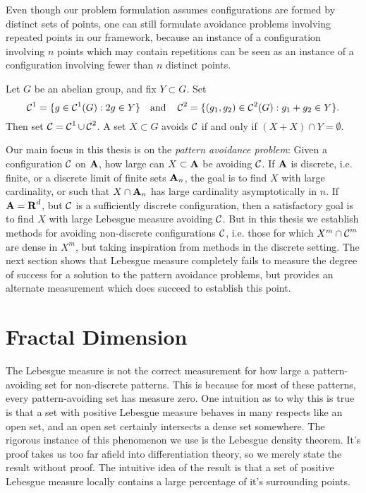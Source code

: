 Even though our problem formulation assumes configurations are formed by distinct sets of points, one can still formulate avoidance problems involving repeated points in our framework, because an instance of a configuration involving $n$ points which may contain repetitions can be seen as an instance of a configuration involving fewer than $n$ distinct points.

\begin{example}
	Let $G$ be an abelian group, and fix $Y \subset G$. Set
	\[ \operatorname{\mathcal{C}}^1 = \{ g \in \operatorname{\mathcal{C}}^1(G): 2g \in Y \} \quad \text{and} \quad \operatorname{\mathcal{C}}^2 = \{ (g_1,g_2) \in \operatorname{\mathcal{C}}^2(G): g_1 + g_2 \in Y \}. \]
	Then set $\operatorname{\mathcal{C}} = \operatorname{\mathcal{C}}^1 \cup \operatorname{\mathcal{C}}^2$. A set $X \subset G$ avoids $\operatorname{\mathcal{C}}$ if and only if $(X + X) \cap Y = \emptyset$.
\end{example}

Our main focus in this thesis is on the {\it pattern avoidance problem}: Given a configuration $\operatorname{\mathcal{C}}$ on $\operatorname{\mathbf{A}}$, how large can $X \subset \operatorname{\mathbf{A}}$ be avoiding $\operatorname{\mathcal{C}}$. If $\operatorname{\mathbf{A}}$ is discrete, i.e. finite, or a discrete limit of finite sets $\operatorname{\mathbf{A}}_n$, the goal is to find $X$ with large cardinality, or such that $X \cap \operatorname{\mathbf{A}}_n$ has large cardinality asymptotically in $n$. If $\operatorname{\mathbf{A}} = \operatorname{\mathbf{R}}^d$, but $\operatorname{\mathcal{C}}$ is a sufficiently discrete configuration, then a satisfactory goal is to find $X$ with large Lebesgue measure avoiding $\operatorname{\mathcal{C}}$. But in this thesis we establish methods for avoiding non-discrete configurations $\operatorname{\mathcal{C}}$, i.e. those for which $X^m \cap \operatorname{\mathcal{C}}^m$ are dense in $X^m$, but taking inspiration from methods in the discrete setting. The next section shows that Lebesgue measure completely fails to measure the degree of success for a solution to the pattern avoidance problems, but provides an alternate measurement which does succeed to establish this point.

\section{Fractal Dimension}

The Lebesgue measure is not the correct measurement for how large a pattern-avoiding set for non-discrete patterns. This is because for most of these patterns, every pattern-avoiding set has measure zero. One intuition as to why this is true is that a set with positive Lebesgue measure behaves in many respects like an open set, and an open set certainly intersects a dense set somewhere. The rigorous instance of this phenomenon we use is the Lebesgue density theorem. It's proof takes us too far afield into differentiation theory, so we merely state the result without proof. The intuitive idea of the result is that a set of positive Lebesgue measure locally contains a large percentage of it's surrounding points.

